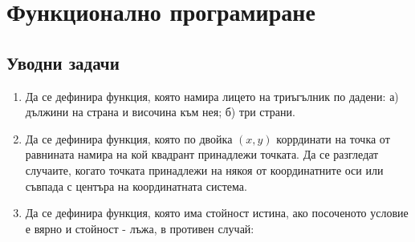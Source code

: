 \chapter{Функционално програмиране}

\setcounter{section}{21}

\section {Уводни задачи}

\begin{enumerate}

  \item Да се дефинира функция, която намира лицето на триъгълник по дадени: а) дължини на страна и височина към нея; б) три страни.
  
  \item Да се дефинира функция, която по двойка $(x,y)$ коррдинати на точка от равнината намира на кой квадрант принадлежи точката. Да се разгледат случаите, когато точката принадлежи на някоя от координатните оси или съвпада с центъра на координатната система.

  \item Да се дефинира функция, която  има стойност истина, ако посоченото условие е вярно и стойност - лъжа, в противен случай:

	\renewcommand{\theenumii}{\Alph{enumii}}


\end{enumerate}
